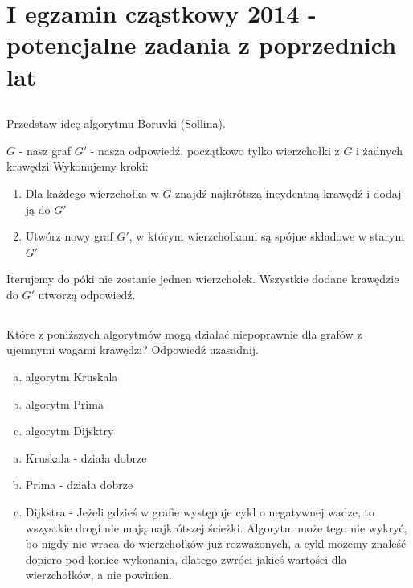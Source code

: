 \documentclass[svgnames]{report}
\begin{document}


\chapter{I egzamin cząstkowy 2014 - potencjalne zadania z poprzednich lat}
\section{}
\begin{framed}
Przedstaw ideę algorytmu Boruvki (Sollina).
\end{framed}
$G$ - nasz graf
$G'$ - nasza odpowiedź, początkowo tylko wierzchołki z $G$ i żadnych krawędzi
Wykonujemy kroki:
\begin{enumerate}
\item Dla każdego wierzchołka w $G$ znajdź najkrótszą incydentną krawędź i dodaj ją do $G'$
\item Utwórz nowy graf $G'$, w którym wierzchołkami są spójne składowe w starym $G'$
 \end{enumerate}
Iterujemy do póki nie zostanie jednen wierzchołek. Wszystkie dodane krawędzie do $G'$ utworzą odpowiedź.
\section{}
\begin{framed}
Które z poniższych algorytmów mogą działać niepoprawnie dla grafów z ujemnymi wagami krawędzi? Odpowiedź uzasadnij.
\begin{enumerate}[a)]
	\item algorytm Kruskala
	\item algorytm Prima
	\item algorytm Dijsktry
\end{enumerate}
\end{framed}

\begin{enumerate}[a)]
\item Kruskala - działa dobrze
\item Prima - działa dobrze
\item Dijkstra - Jeżeli gdzieś w grafie występuje cykl o negatywnej wadze, to wszystkie drogi nie mają najkrótszej ścieżki. Algorytm może tego nie wykryć, bo nigdy nie wraca do wierzchołków już rozważonych, a cykl możemy znaleść dopiero pod koniec wykonania, dlatego zwróci jakieś wartości dla wierzchołków, a nie powinien.
\end{enumerate}
\end{document}
